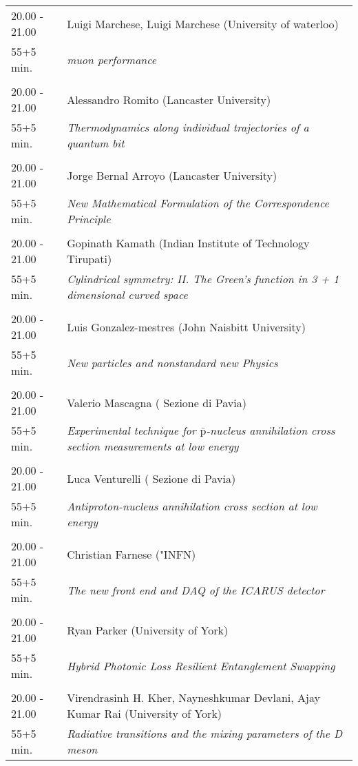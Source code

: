 \begin{longtable}{p{3cm}p{13cm}}
20.00 - 21.00 & Luigi Marchese, Luigi Marchese (University of waterloo)\\ 
55+5 min. & {\it muon performance}\\ 
 & \\ 
20.00 - 21.00 & Alessandro Romito (Lancaster University)\\ 
55+5 min. & {\it Thermodynamics along individual trajectories of a quantum bit}\\ 
 & \\ 
20.00 - 21.00 & Jorge Bernal Arroyo (Lancaster University)\\ 
55+5 min. & {\it New Mathematical Formulation of the Correspondence Principle}\\ 
 & \\ 
20.00 - 21.00 & Gopinath Kamath (Indian Institute of Technology Tirupati)\\ 
55+5 min. & {\it Cylindrical symmetry: II. The Green’s function in 3 + 1 dimensional curved space}\\ 
 & \\ 
20.00 - 21.00 & Luis Gonzalez-mestres (John Naisbitt University)\\ 
55+5 min. & {\it New particles and nonstandard new Physics}\\ 
 & \\ 
20.00 - 21.00 & Valerio Mascagna ( Sezione di Pavia)\\ 
55+5 min. & {\it Experimental technique for $\mathrm{\bar{p}}$-nucleus annihilation cross section measurements at low energy}\\ 
 & \\ 
20.00 - 21.00 & Luca Venturelli ( Sezione di Pavia)\\ 
55+5 min. & {\it Antiproton-nucleus annihilation cross section at low energy}\\ 
 & \\ 
20.00 - 21.00 & Christian Farnese ("INFN)\\ 
55+5 min. & {\it The new front end and DAQ of the ICARUS detector}\\ 
 & \\ 
20.00 - 21.00 & Ryan Parker (University of York)\\ 
55+5 min. & {\it Hybrid Photonic Loss Resilient Entanglement Swapping}\\ 
 & \\ 
20.00 - 21.00 & Virendrasinh H. Kher, Nayneshkumar Devlani, Ajay Kumar Rai (University of York)\\ 
55+5 min. & {\it Radiative transitions and the mixing parameters of the D meson}\\ 

\end{longtable}
